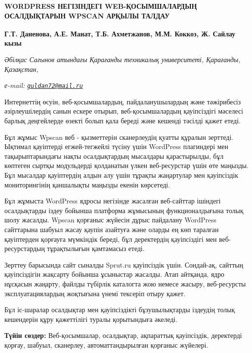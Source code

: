 \begin{articleheader}
{\bfseries WORDPRESS НЕГІЗІНДЕГІ WEB-ҚОСЫМШАЛАРДЫҢ ОСАЛДЫҚТАРЫН WPSCAN АРҚЫЛЫ ТАЛДАУ}

{\bfseries
Г.Т. Даненова\textsuperscript{\envelope },
А.Е. Манат,
Т.Б. Ахметжанов,
М.М. Коккоз,
Ж. Сайлау кызы}
\end{articleheader}

\begin{affiliation}
\emph{Әбілқас Сағынов атындағы Қарағанды техникалық университеті, Қарағанды, Қазақстан,}

\emph{е-mail: \href{mailto:guldan72@mail.ru}{\nolinkurl{guldan72@mail.ru}}}
\end{affiliation}

Интернеттің өсуін, веб-қосымшалардың, пайдаланушылардың және тәжірибесіз
әзірлеушілердің санын ескере отырып, веб-қосымшалардың қауіпсіздігі
мәселесі барлық деңгейлерде өзекті болып қала береді және кешенді
тәсілді қажет етеді.

Бұл жұмыс Wpscan веб - қызметтерін сканерлеудің қуатты құралын зерттеді.
Ықтимал қауіптерді егжей-тегжейлі түсіну үшін WordPress плагиндері мен
тақырыптарындағы нақты осалдықтардың мысалдары қарастырылды, бұл
көптеген сыртқы модульдерді қолданатын үлкен веб-ресурстар үшін өте
маңызды. Бұл мысалдар қауіптердің алдын алу үшін тұрақты жаңартулар мен
қауіпсіздік мониторингінің қаншалықты маңызды екенін көрсетеді.

Бұл жұмыста WordPress ядросы негізінде жасалған веб-сайттар ішіндегі
осалдықтарды іздеу бойынша платформа жұмысының функционалдығына толық
шолу жасалды. Wpscan қорғаныс жүйесін дұрыс пайдалану WordPress
сайттарына шабуыл жасау қаупін азайтуға және оларды ең көп таралған
қауіптерден қорғауға мүмкіндік береді, бұл деректердің қауіпсіздігі мен
веб-ресурстардың тұрақтылығын қамтамасыз етеді.

Зерттеу барысында сайт сыналды Sprut.ru қауіпсіздік үшін. Сондай-ақ,
сайттың қауіпсіздігін жақсарту бойынша ұсыныстар жасалды. Атап айтқанда,
ядро нұсқасын жаңарту, файлды түбірлік каталогта жою немесе жасыру,
веб-ресурсты эксплуатациялардың жоқтығына үнемі тексеріп отыру қажет.

Бұл іс-шаралар осалдықтар мен қауіпсіздікті бұзушылықтарды іздеудің
толық кешендерін құру қажеттілігі туралы қорытындыға әкеледі.

{\bfseries Түйін сөздер:} Веб-қосымшалар, осалдықтар, ақпараттық қауіпсіздік,
деректерді қорғау, шабуыл, сканерлеу, автоматтандырылған қорғаныс
жүйелері.

